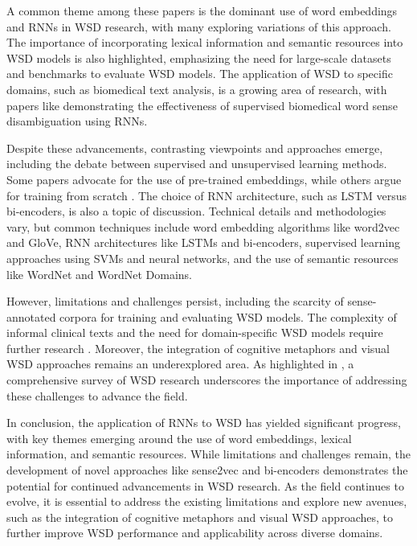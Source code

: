 \documentclass[conference]{IEEEtran}
\begin{document}
A common theme among these papers is the dominant use of word embeddings and RNNs in WSD research, with many exploring variations of this approach. The importance of incorporating lexical information and semantic resources into WSD models is also highlighted, emphasizing the need for large-scale datasets and benchmarks to evaluate WSD models. The application of WSD to specific domains, such as biomedical text analysis, is a growing area of research, with papers like \cite{b1} demonstrating the effectiveness of supervised biomedical word sense disambiguation using RNNs.

Despite these advancements, contrasting viewpoints and approaches emerge, including the debate between supervised and unsupervised learning methods. Some papers advocate for the use of pre-trained embeddings, while others argue for training from scratch \cite{b2}. The choice of RNN architecture, such as LSTM versus bi-encoders, is also a topic of discussion. Technical details and methodologies vary, but common techniques include word embedding algorithms like word2vec and GloVe, RNN architectures like LSTMs and bi-encoders, supervised learning approaches using SVMs and neural networks, and the use of semantic resources like WordNet and WordNet Domains.

However, limitations and challenges persist, including the scarcity of sense-annotated corpora for training and evaluating WSD models. The complexity of informal clinical texts and the need for domain-specific WSD models require further research \cite{b4}. Moreover, the integration of cognitive metaphors and visual WSD approaches remains an underexplored area. As highlighted in \cite{b4}, a comprehensive survey of WSD research underscores the importance of addressing these challenges to advance the field.

In conclusion, the application of RNNs to WSD has yielded significant progress, with key themes emerging around the use of word embeddings, lexical information, and semantic resources. While limitations and challenges remain, the development of novel approaches like sense2vec and bi-encoders demonstrates the potential for continued advancements in WSD research. As the field continues to evolve, it is essential to address the existing limitations and explore new avenues, such as the integration of cognitive metaphors and visual WSD approaches, to further improve WSD performance and applicability across diverse domains.
\end{document}
